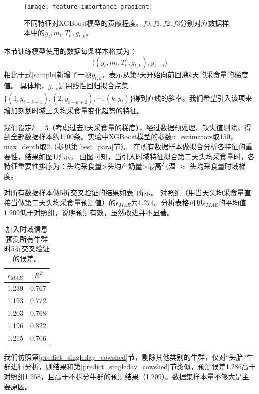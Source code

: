 \begin{figure}
\begin{center}
	\texttt{[image: feature\_importance\_gradient]}
\caption{不同特征对XGBoost模型的贡献程度。$f0,f1,f2,f3$分别对应数据样本中的$y_t, m_t, T^h_t, g_{t,k}$。}
\label{fig:feature_importance_gradient}
\end{center}
\end{figure}

本节训练模型使用的数据每条样本格式为：
\begin{equation}
	\langle (y_t, m_t, T^h_t, g_{t,k}), y_{t+1} \rangle
\end{equation}
相比于式\ref{sample}新增了一项$g_{t,k}$，表示从第$t$天开始向前回溯$k$天的采食量的梯度值。
具体地，$g_{t,k}$是用线性回归拟合点集$\{(1, y_{t-k+1}), (2, y_{t-k+2}), \cdots, (k, y_{t})\}$得到直线的斜率。我们希望引入该项来增加刻划时域上头均采食量变化趋势的特征。

我们设定$k=3$（考虑过去3天采食量的梯度），经过数据预处理、缺失值剔除，得到全部数据样本约1700条。实验中XGBoost模型的参数n\_estimators取150，max\_depth取2（参见第\ref{best_para}节）。
在所有数据样本做拟合分析各特征的重要性，结果如图\ref{fig:feature_importance_gradient}所示。
由图可知，当引入时域特征拟合第二天头均采食量时，各特征重要性排序为：头均采食量>头均产奶量>最高气温 $\approx$ 头均采食量时域梯度。


对所有数据样本做5折交叉验证的结果如表\ref{tab:gradient_predict_all}所示。
对照组（用当天头均采食量直接当做第二天头均采食量预测值）的$\epsilon_{MAE}$为1.274。分析表格可见$\epsilon_{MAE}$的平均值1.209低于对照组，说明\uline{预测有效}，虽然改进并不显著。

\begin{table}
\caption{加入时域信息预测所有牛群时5折交叉验证的误差。}
\begin{center}
\footnotesize
\begin{tabular}{|c|c|}
\hline
	$\epsilon_{MAE}$ & $R^2$ \\
\hline
1.239 & 0.767 \\
1.193 & 0.772 \\
1.203 & 0.768 \\
1.196 & 0.822 \\
1.215 & 0.706 \\
\hline
\end{tabular}
\end{center}
\label{tab:gradient_predict_all}
\end{table}

我们仿照第\ref{predict_singleday_cowshed}节，剔除其他类别的牛群，仅对“头胎”牛群进行分析，则结果和第\ref{predict_singleday_cowshed}节类似，预测误差1.286高于对照组1.258，且高于不拆分牛群的预测结果（1.209）。数据集样本量不够大是主要原因。


